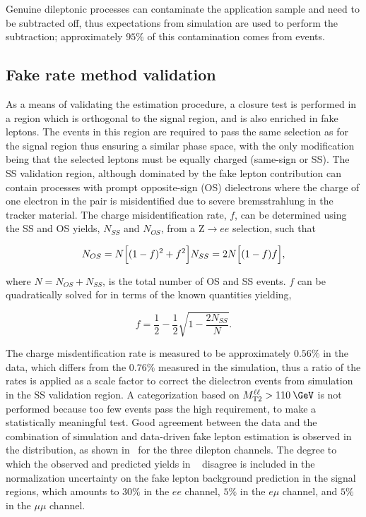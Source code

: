 Genuine dileptonic processes can contaminate the application sample and need to be subtracted off, thus expectations from simulation are used to perform the subtraction; approximately $95\%$ of this contamination comes from \ttll events.

\subsection{Fake rate method validation}
\label{subsec:fr_close}
As a means of validating the estimation procedure, a closure test is performed in a region which is orthogonal to the signal region, and is also enriched in fake leptons. The events in this region are required to pass the same selection as for the signal region thus ensuring a similar phase space, with the only modification being that the selected leptons must be equally charged (same-sign or SS). The SS validation region, although dominated by the fake lepton contribution can contain processes with prompt opposite-sign (OS) dielectrons where the charge of one electron in the pair is misidentified due to severe bremsstrahlung in the tracker material. The charge misidentification rate, $f$, can be determined using the SS and OS yields, $N_{SS}$ and $N_{OS}$, from a Z$\rightarrow ee$ selection, such that 

\begin{equation}
  N_{OS} = N\Big[(1-f)^2 + f^2\Big] \\
  N_{SS} = 2N\Big[(1-f)f\Big],
\end{equation}

where $N = N_{OS} + N_{SS}$, is the total number of OS and SS events. $f$ can be quadratically solved for in terms of the known quantities yielding,

\begin{equation}
  f = \frac{1}{2} - \frac{1}{2}\sqrt{1 - \frac{2N_{SS}}{N}}.
\end{equation}

The charge misdentification rate is measured to be approximately $0.56\%$ in the data, which differs from the $0.76\%$ measured in the simulation, thus a ratio of the rates is applied as a scale factor to correct the dielectron events from simulation in the SS validation region. A categorization based on $\mttll > 110\:\GeV$ is not performed because too few events pass the high \mttll requirement, to make a statistically meaningful test. Good agreement between the data and the combination of simulation and data-driven fake lepton estimation is observed in the \ptmiss distribution, as shown in~ for the three dilepton channels. The degree to which the observed and predicted yields in ~ disagree is included in the normalization uncertainty on the fake lepton background prediction in the signal regions, which amounts to $30\%$ in the $ee$ channel, $5\%$ in the $e\mu$ channel, and $5\%$ in the $\mu\mu$ channel.

